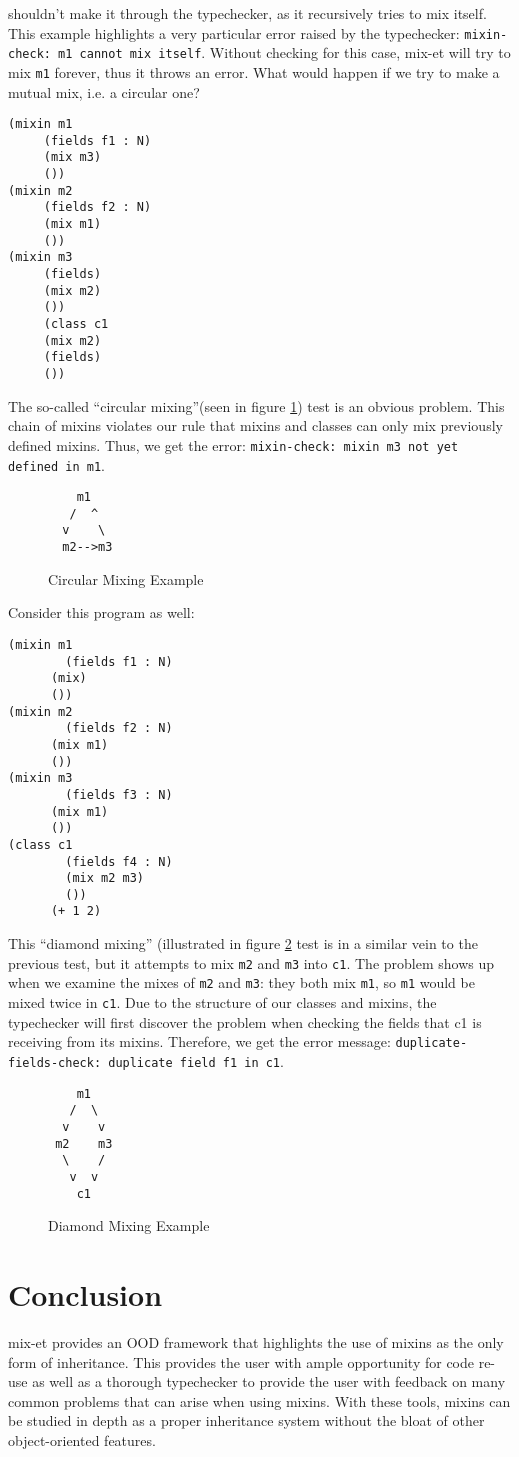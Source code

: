 \documentclass{article}
\begin{document}
shouldn't make it through the typechecker, as it recursively tries to mix itself. This example highlights a very particular error raised by the typechecker: \verb|mixin-check: m1 cannot mix itself|. Without checking for this case, mix-et will try to mix \verb|m1| forever, thus it throws an error.
What would happen if we try to make a mutual mix, i.e. a circular one?
\begin{verbatim}
(mixin m1
	 (fields f1 : N)
	 (mix m3)
	 ())
(mixin m2
	 (fields f2 : N)
	 (mix m1)
	 ())
(mixin m3
	 (fields)
	 (mix m2)
	 ())
	 (class c1
	 (mix m2)
	 (fields)
	 ())
\end{verbatim}
The so-called ``circular mixing''(seen in figure \ref{circle-mix}) test is an obvious problem. This chain of mixins violates our rule that mixins and classes can only mix previously defined mixins. Thus, we get the error:  \verb|mixin-check: mixin m3 not yet defined in m1|.
\begin{figure}[h]
  \centering
  \begin{BVerbatim}
    m1
   /  ^
  v    \
  m2-->m3
  \end{BVerbatim}
  \caption{Circular Mixing Example}
  \label{circle-mix}
\end{figure}

Consider this program as well:
\begin{verbatim}
(mixin m1
        (fields f1 : N)
      (mix)
      ())
(mixin m2
        (fields f2 : N)
      (mix m1)
      ())
(mixin m3
        (fields f3 : N)
      (mix m1)
      ())
(class c1
        (fields f4 : N)
        (mix m2 m3)
        ())
      (+ 1 2)
\end{verbatim}
This ``diamond mixing'' (illustrated in figure \ref{diamond-mix} test is in a similar vein to the previous test, but it attempts to mix \verb|m2| and \verb|m3| into \verb|c1|. The problem shows up when we examine the mixes of \verb|m2| and \verb|m3|: they both mix \verb|m1|, so \verb|m1| would be mixed twice in \verb|c1|. Due to the structure of our classes and mixins, the typechecker will first discover the problem when checking the fields that c1 is receiving from its mixins. Therefore, we get the error message: \verb|duplicate-fields-check: duplicate field f1 in c1|.
\begin{figure}[!]
  \centering
  \begin{BVerbatim}
    m1
   /  \
  v    v
 m2    m3
  \    /
   v  v
    c1
  \end{BVerbatim}
  \caption{Diamond Mixing Example}
  \label{diamond-mix}
\end{figure}
\section*{Conclusion}
mix-et provides an OOD framework that highlights the use of mixins as the only form of inheritance. This provides the user with ample opportunity for code re-use as well as a thorough typechecker to provide the user with feedback on many common problems that can arise when using mixins. With these tools, mixins can be studied in depth as a proper inheritance system without the bloat of other object-oriented features.
{}
  
\end{document}
